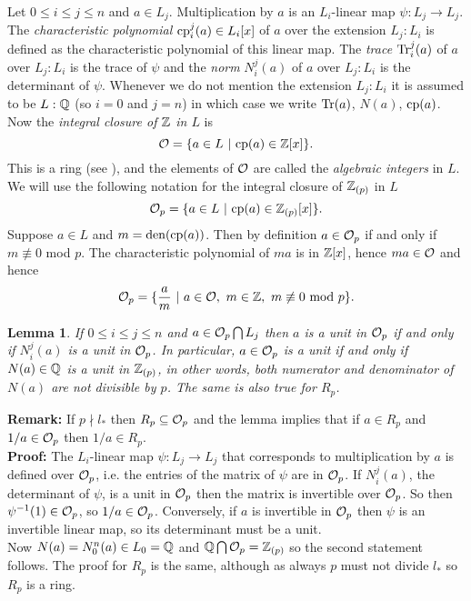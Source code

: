 \documentclass[10pt]{article}
\newcommand{\notdivides}{\nmid}
\newtheorem{lemma}{Lemma}
\newcommand{\Q}{\QQ}
\newcommand{\Z}{\ZZ}
\newcommand{\x}{x}
\begin{document}
Let $0 \leq i \leq j \leq n$ and $a \in L_j$.
Multiplication by $a$ is an $L_i$-linear map $\psi: L_j \rightarrow L_j$.
The {\em characteristic polynomial} ${\rm cp}^j_i(a) \in L_i[\x]$ of $a$ over
the extension $L_j:L_i$ is defined as the characteristic polynomial of
this linear map.
The {\em trace} ${\rm Tr}^j_i(a)$ of $a$ over $L_j:L_i$ is the trace of $\psi$
and the {\em norm} $N^j_i(a)$ of $a$ over $L_j:L_i$ is the determinant of $\psi$.
Whenever we do not mention the extension $L_j:L_i$ it is assumed to
be $L:\Q$ (so $i=0$ and $j=n$) in which case we
write ${\rm Tr}(a)$, $N(a)$, ${\rm cp}(a)$.
Now the {\em integral closure of $\Z$ in $L$} is
\[
	{\cal O} = \{ a \in L\ \vert\  {\rm cp}(a) \in \Z[x]\}.
\]
This is a ring (see \cite{Hecke}), and the elements of ${\cal O}$
are called the {\em algebraic integers} in $L$.
We will use the following notation for the integral closure of $\Z_{(p)}$
in $L$
\[
	{\cal O}_p = \{ a \in L\ \vert\ {\rm cp}(a) \in \Z_{(p)}[x]\}.
\]
Suppose $a \in L$ and $m = {\rm den}({\rm cp}(a))$.
Then by definition $a \in {\cal O}_p$ if and only if $m \not\equiv 0$ mod $p$.
The characteristic polynomial of $ma$ is in $\Z[x]$, hence $ma \in {\cal O}$
and hence
\begin{equation}
\label{Op}
	{\cal O}_p =
	\{\frac{a}m\ \vert\ a \in {\cal O}, \ m \in \Z, \ m \not\equiv 0
	{\rm \ mod \ } p\}.
\end{equation}

\begin{lemma}
\label{unit}
If $0 \leq i \leq j \leq n$ and $a \in {\cal O}_p \bigcap L_j$ then $a$ is a unit
in ${\cal O}_p$ if and only if $N^j_i(a)$ is a unit in ${\cal O}_p$.
In particular, $a \in {\cal O}_p$ is a unit if and only if
$N(a) \in \Q$ is a unit in $\Z_{(p)}$, in other words,
both numerator and denominator
of $N(a)$ are not divisible by $p$.
The same is also true for $R_p$.
\end{lemma}
{\bf Remark:} If $p \notdivides l_*$ then $R_p \subseteq {\cal O}_p$
and the lemma implies that if $a \in R_p$ and
$1/a \in {\cal O}_p$ then $1/a \in R_p$. \\[5pt]
{\bf Proof:} The $L_i$-linear map $\psi:L_j \rightarrow L_j$
that corresponds to multiplication by $a$ is defined over ${\cal O}_p$, i.e.
the entries of the matrix of $\psi$ are in ${\cal O}_p$. If $N^j_i(a)$,
the determinant of $\psi$,
is a unit in ${\cal O}_p$ then the matrix is invertible over ${\cal O}_p$.
So then $\psi^{-1}(1) \in {\cal O}_p$, so $1/a \in {\cal O}_p$.
Conversely, if $a$ is invertible in ${\cal O}_p$ then $\psi$ is an invertible
linear map, so its determinant must be a unit. \\
Now $N(a) = N^n_0(a) \in L_0 = \Q$ and $\Q \bigcap {\cal O}_p = \Z_{(p)}$ so the
second statement follows. The proof for $R_p$ is the same,
although as always $p$ must not divide $l_*$ so $R_p$ is a ring.
\\
\end{document}
